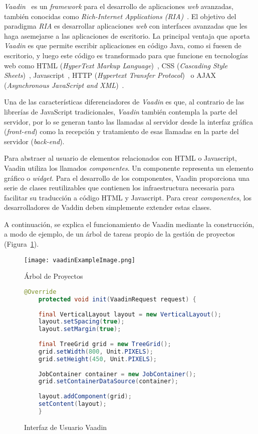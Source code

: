 

\emph{Vaadin}~\cite{vaadin} es un \emph{framework} para el desarrollo de aplicaciones \emph{web} avanzadas, también conocidas como \emph{Rich-Internet Applications (RIA)}~\cite{ria}. El objetivo del paradigma \emph{RIA} es desarrollar aplicaciones \emph{web} con interfaces avanzadas que les haga asemejarse a las aplicaciones de escritorio. La principal ventaja que aporta \emph{Vaadin} es que permite escribir aplicaciones en código Java, como si fuesen de escritorio, y luego este código es transformado para que funcione en tecnologías web como HTML (\emph{HyperText Markup Language})~\cite{html}, CSS (\emph{Cascading Style Sheets})~\cite{css}, Javascript~\cite{javascript}, HTTP (\emph{Hypertext Transfer Protocol})~\cite{http} o AJAX (\emph{Asynchronous JavaScript and XML})~\cite{ajax}.

Una de las características diferenciadores de \emph{Vaadin} es que, al contrario de las librerías de JavaScript tradicionales, \emph{Vaadin} también contempla la parte del servidor, por lo se generan tanto las llamadas al servidor desde la interfaz gráfica (\emph{front-end}) como la recepción y tratamiento de esas llamadas en la parte del servidor (\emph{back-end}).

Para abstraer al usuario de elementos relacionados con HTML o Javascript, Vaadin utiliza los llamados \emph{componentes}. Un componente representa un elemento gráfico o \emph{widget}. Para el desarrollo de los componentes, Vaadin proporciona una serie de clases reutilizables que contienen los infraestructura necesaria para facilitar su traducción a código HTML y Javascript. Para crear \emph{componentes}, los desarrolladores de Vaddin deben simplemente extender estas clases.

A continuación, se explica el funcionamiento de Vaadin mediante la construcción, a modo de ejemplo, de un árbol de tareas propio de la gestión de proyectos  (Figura~\ref{fig:vaadinExampleImage}).

\begin{figure}[!tb]
	\centering
	\texttt{[image: vaadinExampleImage.png]}
	\caption{Árbol de Proyectos}
	\label{fig:vaadinExampleImage}
\end{figure}

\begin{figure}[!tb]
	\centering
	\begin{lstlisting}[language=Java]
	@Override
	protected void init(VaadinRequest request) {
	
	final VerticalLayout layout = new VerticalLayout();
	layout.setSpacing(true);
	layout.setMargin(true);
	
	final TreeGrid grid = new TreeGrid();
	grid.setWidth(800, Unit.PIXELS);
	grid.setHeight(450, Unit.PIXELS);
	
	JobContainer container = new JobContainer();
	grid.setContainerDataSource(container);
	
	layout.addComponent(grid);
	setContent(layout);
	}
	\end{lstlisting}
	\vspace{-15pt}
	\caption{Interfaz de Usuario Vaadin}
	\label{fig:uiVaadin}
\end{figure}


